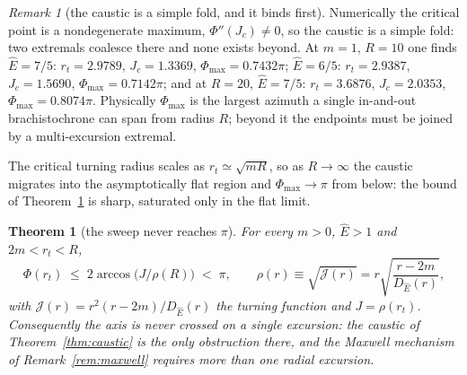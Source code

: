 \documentclass[12pt]{iopart}
\newcommand{\Ehat}{\hat E}
\theoremstyle{plain}
\theoremstyle{definition}
\theoremstyle{plain}
\newtheorem{auxtheorem}[auxlemma]{Theorem}
\theoremstyle{remark}
\newtheorem*{remark}{Remark}
\begin{document}
\begin{remark}[the caustic is a simple fold, and it binds first]\label{rem:caustic-num}
Numerically the critical point is a nondegenerate maximum, $\Phi''(J_c)\neq0$, so the
caustic is a simple fold: two extremals coalesce there and none exists beyond. At
$m=1$, $R=10$ one finds $\Ehat=7/5$: $r_t=2.9789$, $J_c=1.3369$, $\Phi_{\max}=0.7432\pi$;
$\Ehat=6/5$: $r_t=2.9387$, $J_c=1.5690$, $\Phi_{\max}=0.7142\pi$; and at $R=20$,
$\Ehat=7/5$: $r_t=3.6876$, $J_c=2.0353$, $\Phi_{\max}=0.8074\pi$. Physically
$\Phi_{\max}$ is the largest azimuth a single in-and-out brachistochrone can span from
radius $R$; beyond it the endpoints must be joined by a multi-excursion extremal.

The critical turning radius scales as $r_t\simeq\sqrt{mR}$, so as $R\to\infty$ the caustic
migrates into the asymptotically flat region and $\Phi_{\max}\to\pi$ from below: the bound
of Theorem~\ref{thm:chord} is sharp, saturated only in the flat limit.
\end{remark}

\begin{auxtheorem}[the sweep never reaches $\pi$]\label{thm:chord}
For every $m>0$, $\Ehat>1$ and $2m<r_t<R$,
\begin{equation}
   \Phi(r_t)\;\le\;2\arccos\!\big(J/\rho(R)\big)\;<\;\pi,
   \qquad \rho(r)\equiv\sqrt{\mathcal J(r)}=r\sqrt{\frac{r-2m}{D_{\Ehat}(r)}},
   \label{eq:chord-bound}
\end{equation}
with $\mathcal J(r)=r^2(r-2m)/D_{\Ehat}(r)$ the turning function and $J=\rho(r_t)$.
Consequently the axis is never crossed on a single excursion: the caustic of
Theorem~\ref{thm:caustic} is the \emph{only} obstruction there, and the Maxwell mechanism
of Remark~\ref{rem:maxwell} requires more than one radial excursion.
\end{auxtheorem}
\end{document}
